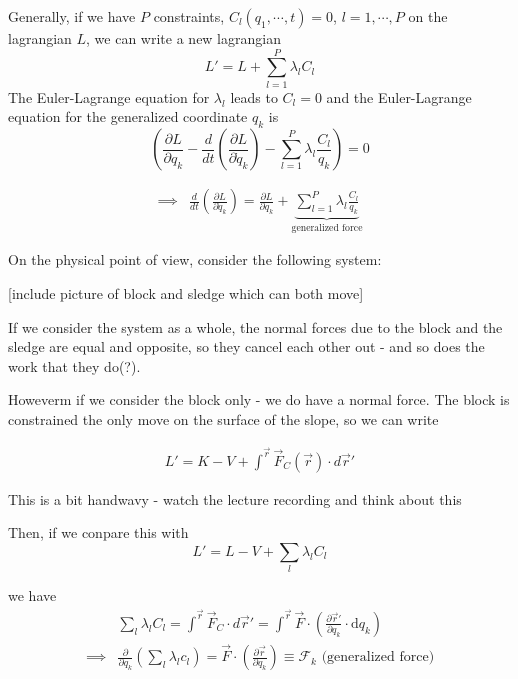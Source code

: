\documentclass[11pt]{article}
\begin{document}
\vskip 0.5cm
\begin{redbox}
  Generally, if we have $P$ constraints, $C_{l}(q_1, \cdots, t) = 0$, $l = 1, \cdots, P$ on the lagrangian $L$, we can write a new lagrangian 
  \[ L' = L + \sum_{l = 1}^{P} \lambda_l C_l \]
  The Euler-Lagrange equation for $\lambda_l$ leads to $C_l = 0$ and the Euler-Lagrange equation for the generalized coordinate $q_k$ is 
  \[ \left( \frac{\partial L }{\partial q_{k}} - \frac{d}{dt} \left( \frac{\partial L}{\partial \dot{q}_{k}} \right) - \sum_{l = 1}^{P} \lambda_l \frac{C_l}{q_k} \right) = 0 \] 

  \begin{align*}
    \implies& \frac{d}{dt} \left( \frac{\partial L}{\partial \dot{q}_{k}} \right) = \frac{\partial L }{\partial q_{k}} + \underbrace{\sum_{l = 1}^{P} \lambda_l \frac{C_l}{q_k} }_{\text{generalized force}}
  \end{align*}
\end{redbox}

On the physical point of view, consider the following system:

\vskip 0.5cm
[include picture of block and sledge which can both move]
\vskip 0.5cm

If we consider the system as a whole, the normal forces due to the block and the sledge are equal and opposite, so they cancel each other out - and so does the work that they do(?).

\vskip 0.5cm
Howeverm if we consider the block only - we do have a normal force. The block is constrained the only move on the surface of the slope, so we can write 

\begin{align*}
  L' = K - V + \int^{\vec{r}} \vec{F}_C(\vec{r}) \cdot d\vec{r}'
\end{align*}

\begin{thought}
  {This is a bit handwavy - watch the lecture recording and think about this}
\end{thought}

Then, if we conpare this with 
\[ L' = L - V + \sum_{l} \lambda_l C_l \]

we have 
\begin{align*}
  &\sum_{l} \lambda_l C_l = \int^{\vec{r}} \vec{F}_C \cdot d\vec{r}' = \int^{\vec{r}} \vec{F} \cdot \left( \frac{\partial \vec{r}'}{\partial q_k} \cdot \mathrm{d}q_k \right) \\
  \implies& \frac{\partial}{\partial q_k} \left( \sum_{l} \lambda_l c_l \right) = \vec{F} \cdot \left( \frac{\partial \vec{r}}{\partial q_{k}} \right) \equiv \mathcal{F}_k \text{  (generalized force)}
\end{align*}

    

    



\end{document}
